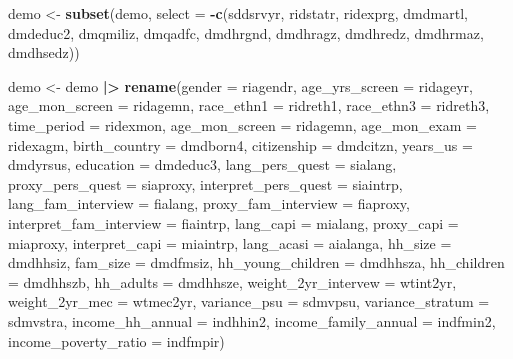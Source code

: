 \documentclass[
]{article}
\newenvironment{Shaded}{\begin{snugshade}}{\end{snugshade}}
\newcommand{\AttributeTok}[1]{\textcolor[rgb]{0.13,0.29,0.53}{#1}}
\newcommand{\FunctionTok}[1]{\textcolor[rgb]{0.13,0.29,0.53}{\textbf{#1}}}
\newcommand{\NormalTok}[1]{#1}
\newcommand{\OtherTok}[1]{\textcolor[rgb]{0.56,0.35,0.01}{#1}}
\newcommand{\SpecialCharTok}[1]{\textcolor[rgb]{0.81,0.36,0.00}{\textbf{#1}}}
\begin{document}
\begin{Shaded}
\begin{Highlighting}[]
\NormalTok{demo }\OtherTok{\textless{}{-}} \FunctionTok{subset}\NormalTok{(demo, }\AttributeTok{select =} \SpecialCharTok{{-}}\FunctionTok{c}\NormalTok{(sddsrvyr, ridstatr, ridexprg, dmdmartl, dmdeduc2, dmqmiliz, dmqadfc, dmdhrgnd, dmdhragz, dmdhredz, dmdhrmaz, dmdhsedz))}

\NormalTok{demo }\OtherTok{\textless{}{-}}\NormalTok{ demo }\SpecialCharTok{|\textgreater{}} 
  \FunctionTok{rename}\NormalTok{(}\AttributeTok{gender =}\NormalTok{ riagendr, }
         \AttributeTok{age\_yrs\_screen =}\NormalTok{ ridageyr, }
         \AttributeTok{age\_mon\_screen =}\NormalTok{ ridagemn, }
         \AttributeTok{race\_ethn1 =}\NormalTok{ ridreth1,}
         \AttributeTok{race\_ethn3 =}\NormalTok{ ridreth3, }
         \AttributeTok{time\_period =}\NormalTok{ ridexmon, }
         \AttributeTok{age\_mon\_screen =}\NormalTok{ ridagemn,}
         \AttributeTok{age\_mon\_exam =}\NormalTok{ ridexagm, }
         \AttributeTok{birth\_country =}\NormalTok{ dmdborn4, }
         \AttributeTok{citizenship =}\NormalTok{ dmdcitzn,}
         \AttributeTok{years\_us =}\NormalTok{ dmdyrsus, }
         \AttributeTok{education =}\NormalTok{ dmdeduc3, }
         \AttributeTok{lang\_pers\_quest =}\NormalTok{ sialang, }
         \AttributeTok{proxy\_pers\_quest =}\NormalTok{ siaproxy, }
         \AttributeTok{interpret\_pers\_quest =}\NormalTok{ siaintrp, }
         \AttributeTok{lang\_fam\_interview =}\NormalTok{ fialang, }
         \AttributeTok{proxy\_fam\_interview =}\NormalTok{ fiaproxy, }
         \AttributeTok{interpret\_fam\_interview =}\NormalTok{ fiaintrp,}
         \AttributeTok{lang\_capi =}\NormalTok{ mialang, }
         \AttributeTok{proxy\_capi =}\NormalTok{ miaproxy, }
         \AttributeTok{interpret\_capi =}\NormalTok{ miaintrp, }
         \AttributeTok{lang\_acasi =}\NormalTok{ aialanga, }
         \AttributeTok{hh\_size =}\NormalTok{ dmdhhsiz, }
         \AttributeTok{fam\_size =}\NormalTok{ dmdfmsiz, }
         \AttributeTok{hh\_young\_children =}\NormalTok{ dmdhhsza,}
         \AttributeTok{hh\_children =}\NormalTok{ dmdhhszb, }
         \AttributeTok{hh\_adults =}\NormalTok{ dmdhhsze, }
         \AttributeTok{weight\_2yr\_intervew =}\NormalTok{ wtint2yr,}
         \AttributeTok{weight\_2yr\_mec =}\NormalTok{ wtmec2yr, }
         \AttributeTok{variance\_psu =}\NormalTok{ sdmvpsu, }
         \AttributeTok{variance\_stratum =}\NormalTok{ sdmvstra, }
         \AttributeTok{income\_hh\_annual =}\NormalTok{ indhhin2, }
         \AttributeTok{income\_family\_annual =}\NormalTok{ indfmin2, }
         \AttributeTok{income\_poverty\_ratio =}\NormalTok{ indfmpir)}
\end{Highlighting}
\end{Shaded}
\end{document}
